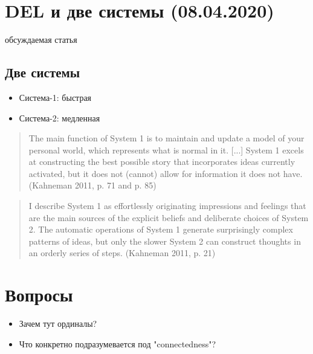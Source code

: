 \section{DEL и две системы (08.04.2020)}
обсуждаемая статья \autocite{Solaki2019TheThinking}

\subsection{Две системы}

\begin{itemize}
	\item Система-1: быстрая
	\item Система-2: медленная
\end{itemize}

\begin{quote}
The main function of System 1 is to maintain and update a model of your personal world, which represents what is normal in it. [...] System 1 excels at constructing the best possible story that incorporates ideas currently activated, but it does not (cannot) allow for information it does not have. (Kahneman 2011, p. 71 and p. 85)	
\end{quote}

\begin{quote}
I describe System 1 as effortlessly originating impressions and feelings that are the main sources of the explicit beliefs and deliberate choices of System 2. The automatic operations of System 1 generate surprisingly complex patterns of ideas, but only the slower System 2 can construct thoughts in an orderly series of steps. (Kahneman 2011, p. 21)	
\end{quote}

\section{Вопросы}

\begin{itemize}
    \item Зачем тут ординалы?
    \item Что конкретно подразумевается под "connectedness"?
\end{itemize}

